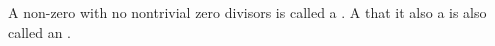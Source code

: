 \begin{definition} \label{definition:domain_integral_domain}
    A non-zero  with no nontrivial zero divisors is called a .
    A  that it also a  is also called an .
\end{definition}